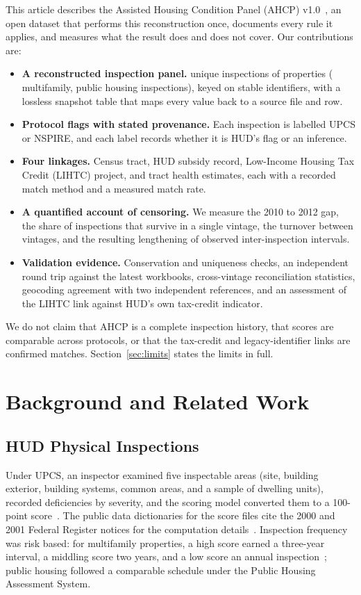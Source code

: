 \documentclass[10pt,twocolumn,letterpaper]{article}
\begin{document}
This article describes the Assisted Housing Condition Panel (AHCP) v1.0~\cite{ahcp}, an open dataset that performs this reconstruction once, documents every rule it applies, and measures what the result does and does not cover. Our contributions are:
\begin{itemize}
\item \textbf{A reconstructed inspection panel.} \SInspections{} unique inspections of \SProperties{} properties (\SInspectionsMf{} multifamily, \SInspectionsPh{} public housing inspections), keyed on stable identifiers, with a lossless snapshot table that maps every value back to a source file and row.
\item \textbf{Protocol flags with stated provenance.} Each inspection is labelled UPCS or NSPIRE, and each label records whether it is HUD's flag or an inference.
\item \textbf{Four linkages.} Census tract, HUD subsidy record, Low-Income Housing Tax Credit (LIHTC) project, and tract health estimates, each with a recorded match method and a measured match rate.
\item \textbf{A quantified account of censoring.} We measure the 2010 to 2012 gap, the share of inspections that survive in a single vintage, the turnover between vintages, and the resulting lengthening of observed inter-inspection intervals.
\item \textbf{Validation evidence.} Conservation and uniqueness checks, an independent round trip against the latest workbooks, cross-vintage reconciliation statistics, geocoding agreement with two independent references, and an assessment of the LIHTC link against HUD's own tax-credit indicator.
\end{itemize}
We do not claim that AHCP is a complete inspection history, that scores are comparable across protocols, or that the tax-credit and legacy-identifier links are confirmed matches. Section~\ref{sec:limits} states the limits in full.

\section{Background and Related Work}
\subsection{HUD Physical Inspections}
Under UPCS, an inspector examined five inspectable areas (site, building exterior, building systems, common areas, and a sample of dwelling units), recorded deficiencies by severity, and the scoring model converted them to a 100-point score~\cite{cfr5g,fr2000,fr2001}. The public data dictionaries for the score files cite the 2000 and 2001 Federal Register notices for the computation details~\cite{fr2000,fr2001}. Inspection frequency was risk based: for multifamily properties, a high score earned a three-year interval, a middling score two years, and a low score an annual inspection~\cite{cfr200857}; public housing followed a comparable schedule under the Public Housing Assessment System.
\end{document}
